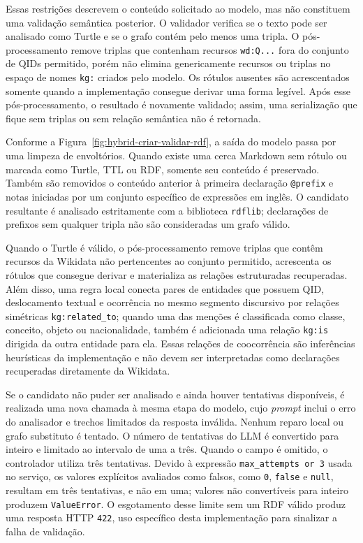 Essas restrições descrevem o conteúdo solicitado ao modelo, mas não constituem
uma validação semântica posterior. O validador verifica se o texto pode ser
analisado como Turtle e se o grafo contém pelo menos uma tripla. O
pós-processamento remove triplas que contenham recursos \texttt{wd:Q...} fora do
conjunto de QIDs permitido, porém não elimina genericamente recursos ou triplas
no espaço de nomes \texttt{kg:} criados pelo modelo. Os rótulos ausentes são
acrescentados somente quando a implementação consegue derivar uma forma legível.
Após esse pós-processamento, o resultado é novamente validado; assim, uma
serialização que fique sem triplas ou sem relação semântica não é retornada.

Conforme a Figura~\ref{fig:hybrid-criar-validar-rdf}, a saída do modelo passa por
uma limpeza de envoltórios. Quando existe uma cerca Markdown sem rótulo ou
marcada como Turtle, TTL ou RDF, somente seu conteúdo é preservado. Também são
removidos o conteúdo anterior à primeira declaração \texttt{@prefix} e notas
iniciadas por um conjunto específico de expressões em inglês. O candidato
resultante é analisado estritamente com a biblioteca \texttt{rdflib};
declarações de prefixos sem qualquer tripla não são consideradas um grafo válido.

Quando o Turtle é válido, o pós-processamento remove triplas que contêm recursos
da Wikidata não pertencentes ao conjunto permitido, acrescenta os rótulos que
consegue derivar e materializa as relações estruturadas recuperadas. Além disso,
uma regra local
conecta pares de entidades que possuem QID, deslocamento textual e ocorrência no
mesmo segmento discursivo por relações simétricas \texttt{kg:related\_to}; quando
uma das menções é classificada como classe, conceito, objeto ou nacionalidade,
também é adicionada uma relação \texttt{kg:is} dirigida da outra entidade para
ela. Essas relações de coocorrência são inferências heurísticas da implementação
e não devem ser interpretadas como declarações recuperadas diretamente da
Wikidata.

Se o candidato não puder ser analisado e ainda houver tentativas disponíveis,
é realizada uma nova chamada à mesma etapa do modelo, cujo
\textit{prompt} inclui o erro do analisador e trechos limitados da resposta
inválida. Nenhum reparo local ou grafo substituto é tentado. O número de
tentativas do LLM é convertido para inteiro e limitado ao
intervalo de uma a três. Quando o campo é omitido, o controlador utiliza três
tentativas. Devido à expressão \texttt{max\_attempts or 3} usada no serviço, os
valores explícitos avaliados como falsos, como \texttt{0}, \texttt{false} e
\texttt{null}, resultam em três tentativas, e não em uma; valores não
convertíveis para inteiro produzem \texttt{ValueError}. O
esgotamento desse limite sem um RDF válido produz uma resposta HTTP \texttt{422},
uso específico desta implementação para sinalizar a falha de validação.

